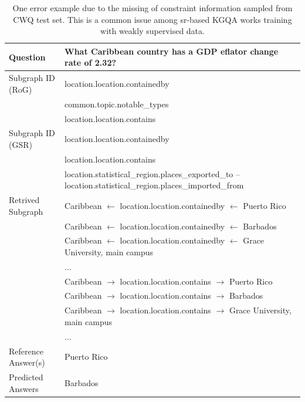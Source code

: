 \begin{table}[h]
    \small
    \centering
    \begin{tabular}{lp{12cm}}
    \toprule
        Question & What Caribbean country has a GDP eflator change rate of 2.32? \\ \midrule
        Subgraph ID (RoG) & location.location.containedby \\
        & common.topic.notable\_types \\
        & location.location.contains \\ \midrule
        Subgraph ID (GSR) & location.location.containedby \\
        & location.location.contains\\
        & location.statistical\_region.places\_exported\_to -- location.statistical\_region.places\_imported\_from \\ \midrule
        Retrived Subgraph & Caribbean $\leftarrow$ location.location.containedby $\leftarrow$ Puerto Rico \\
        & Caribbean $\leftarrow$ location.location.containedby $\leftarrow$ Barbados \\
        & Caribbean $\leftarrow$ location.location.containedby $\leftarrow$ Grace University, main campus \\
        & ... \\
        & Caribbean $\rightarrow$ location.location.contains $\rightarrow$ Puerto Rico \\
        & Caribbean $\rightarrow$ location.location.contains $\rightarrow$ Barbados \\
        & Caribbean $\rightarrow$ location.location.contains $\rightarrow$ Grace University, main campus \\
        & ... \\
        \midrule
        Reference Answer(s) & Puerto Rico \\
        \midrule
        Predicted Answers & Barbados \\
    \bottomrule
    \end{tabular}
    \caption{One error example due to the missing of constraint information sampled from CWQ test set. This is a common issue among sr-based KGQA works training with weakly supervised data.}
    \label{tab:constraint_example}
\end{table}
